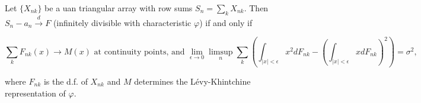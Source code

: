 Let $\{X_{nk}\}$ be a uan triangular array with row sums $S_n = \sum_k X_{nk}$. Then $S_n - a_n \xrightarrow{d} F$ (infinitely divisible with characteristic $\varphi$) if and only if

$$\sum_k F_{nk}(x) \to M(x) \text{ at continuity points, and } \lim_{\epsilon \to 0} \limsup_n \sum_k \left(\int_{|x|<\epsilon} x^2 dF_{nk} - \left(\int_{|x|<\epsilon} x dF_{nk}\right)^2\right) = \sigma^2,$$

where $F_{nk}$ is the d.f. of $X_{nk}$ and $M$ determines the Lévy-Khintchine representation of $\varphi$.

